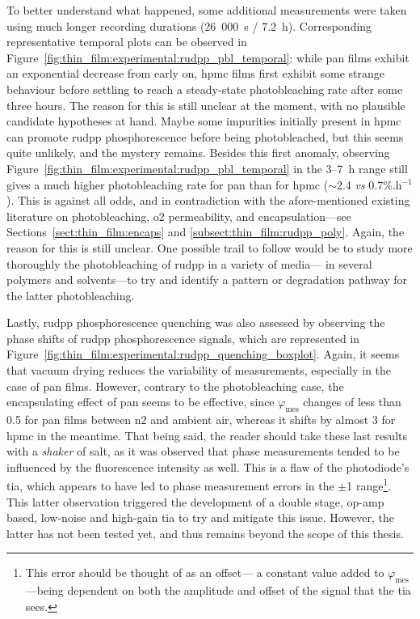 To better understand what happened, some additional measurements were taken using much longer recording durations (26~000~s / 7.2~h). Corresponding representative temporal plots can be observed in Figure~\ref{fig:thin_film:experimental:rudpp_pbl_temporal}: while \gls{pan} films exhibit an exponential decrease from early on, \gls{hpmc} films first exhibit some strange behaviour before settling to reach a steady-state photobleaching rate after some three hours. The reason for this is still unclear at the moment, with no plausible candidate hypotheses at hand. Maybe some impurities initially present in \gls{hpmc} can promote \gls{rudpp} phosphorescence before being photobleached, but this seems quite unlikely, and the mystery remains. Besides this first anomaly, observing Figure~\ref{fig:thin_film:experimental:rudpp_pbl_temporal} in the 3--7~h range still gives a much higher photobleaching rate for \gls{pan} than for \gls{hpmc} ($\sim$2.4 \textit{vs} 0.7\%.h$^{-1}$). This is against all odds, and in contradiction with the afore-mentioned existing literature on photobleaching, \gls{o2} permeability, and encapsulation---see Sections~\ref{sect:thin_film:encaps} and \ref{subsect:thin_film:rudpp_poly}. Again, the reason for this is still unclear. One \mfrin{}possible trail to follow would be to study more thoroughly the photobleaching of \gls{rudpp} in a variety of media---\ie{} in several polymers and solvents---to try and identify a pattern or degradation pathway for the latter photobleaching.

Lastly, \gls{rudpp} phosphorescence quenching was also assessed by observing the phase shifts of \gls{rudpp} phosphorescence signals, which are represented in Figure~\ref{fig:thin_film:experimental:rudpp_quenching_boxplot}. Again, it seems that vacuum drying reduces the variability of measurements, especially in the case of \gls{pan} films. However, contrary to the photobleaching case, the encapsulating effect of \gls{pan} seems to be effective, since $\varphi_\text{mes}$ changes of less than 0.5{\degree} for \gls{pan} films between \gls{n2} and ambient air, whereas it shifts by almost 3{\degree} for \gls{hpmc} in the meantime. That being said, the reader should take these last results with a \emph{shaker} of salt, as it was observed that phase measurements tended to be influenced by the fluorescence intensity as well. This is a flaw of the photodiode's \gls{tia}, which appears to have led to phase measurement errors in the $\pm$1{\degree} range\footnote{This error should be thought of as an offset---\ie{} a constant value added to $\varphi_\text{mes}$---being dependent on both the amplitude and offset of the signal that the \gls{tia} sees.}. This latter observation triggered the development of a double stage, op-amp based, low-noise and high-gain \gls{tia} to try and mitigate this issue. However, the latter has not been tested yet, and thus remains beyond the scope of this thesis.

